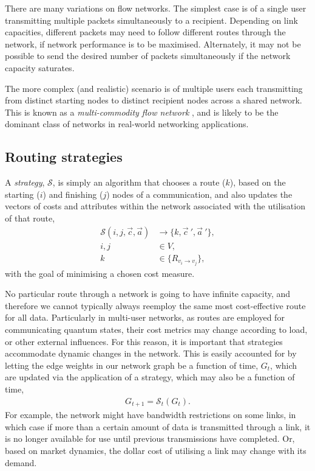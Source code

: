 \documentclass[aps, rmp, twocolumn, amsmath, amssymb, nofootinbib, superscriptaddress, longbibliography, floatfix, table-of-contents, eqsecnum]{revtex4-1}
\begin{document}
There are many variations on flow networks. The simplest case is of a single user transmitting multiple packets simultaneously to a recipient. Depending on link capacities, different packets may need to follow different routes through the network, if network performance is to be maximised. Alternately, it may not be possible to send the desired number of packets simultaneously if the network capacity saturates.

The more complex (and realistic) scenario is of multiple users each transmitting from distinct starting nodes to distinct recipient nodes across a shared network. This is known as a \textit{multi-commodity flow network} \cite{???}, and is likely to be the dominant class of networks in real-world networking applications.

%
%

\subsection{Routing strategies} \label{sec:route_strats} 

A \textit{strategy}, $\mathcal{S}$, is simply an algorithm that chooses a route ($k$), based on the starting ($i$) and finishing ($j$) nodes of a communication, and also updates the vectors of costs and attributes within the network associated with the utilisation of that route,
\begin{align}
\mathcal{S}(i,j,\vec{c},\vec{a}) &\to \{k,{\vec{c}}~',{\vec{a}}~'\}, \nonumber \\
i,j &\in V, \nonumber\\
k &\in \{R_{v_i\to v_j}\},
\end{align}
with the goal of minimising a chosen cost measure.

No particular route through a network is going to have infinite capacity, and therefore we cannot typically always reemploy the same most cost-effective route for all data. Particularly in multi-user networks, as routes are employed for communicating quantum states, their cost metrics may change according to load, or other external influences. For this reason, it is important that strategies accommodate dynamic changes in the network. This is easily accounted for by letting the edge weights in our network graph be a function of time, $G_t$, which are updated via the application of a strategy, which may also be a function of time,
\begin{align} \label{eq:S_G}
G_{t+1} = \mathcal{S}_t(G_t).
\end{align}
For example, the network might have bandwidth restrictions on some links, in which case if more than a certain amount of data is transmitted through a link, it is no longer available for use until previous transmissions have completed. Or, based on market dynamics, the dollar cost of utilising a link may change with its demand.
\end{document}
